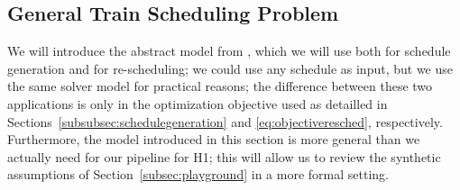 \documentclass{article}
\begin{document}
            
\subsection{General Train Scheduling Problem}\label{subsubsec:scheduleproblemdescription}



We will introduce the abstract model from \cite{DBLP:journals/corr/abs-2003-08598}, which we will use both for schedule generation and for re-scheduling; we could use any schedule as input, but we use the same solver model for practical reasons; the difference between these two applications is only in the optimization objective used as detailled in Sections~\ref{subsubsec:schedulegeneration} and \ref{eq:objectiveresched}, respectively.
Furthermore, the model introduced in this section is more general than we actually need for our pipeline for H1; this will allow us to review the synthetic assumptions of Section~\ref{subsec:playground} in a more formal setting.
\end{document}

